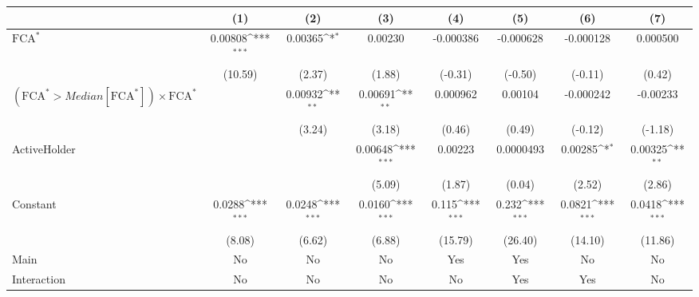 {
\def\sym#1{\ifmmode^{#1}\else\(^{#1}\)\fi}
\begin{tabular}{l*{7}{c}}
\hline\hline
                    &\multicolumn{1}{c}{(1)}         &\multicolumn{1}{c}{(2)}         &\multicolumn{1}{c}{(3)}         &\multicolumn{1}{c}{(4)}         &\multicolumn{1}{c}{(5)}         &\multicolumn{1}{c}{(6)}         &\multicolumn{1}{c}{(7)}         \\
\hline
$ \text{FCA}^* $    &     0.00808\sym{***}&     0.00365\sym{*}  &     0.00230         &   -0.000386         &   -0.000628         &   -0.000128         &    0.000500         \\
                    &     (10.59)         &      (2.37)         &      (1.88)         &     (-0.31)         &     (-0.50)         &     (-0.11)         &      (0.42)         \\
[1em]
 $ (\text{FCA}^* > Median[\text{FCA}^*]) \times {\text{FCA} ^*}  $ &                     &     0.00932\sym{**} &     0.00691\sym{**} &    0.000962         &     0.00104         &   -0.000242         &    -0.00233         \\
                    &                     &      (3.24)         &      (3.18)         &      (0.46)         &      (0.49)         &     (-0.12)         &     (-1.18)         \\
[1em]
ActiveHolder        &                     &                     &     0.00648\sym{***}&     0.00223         &   0.0000493         &     0.00285\sym{*}  &     0.00325\sym{**} \\
                    &                     &                     &      (5.09)         &      (1.87)         &      (0.04)         &      (2.52)         &      (2.86)         \\
[1em]
Constant            &      0.0288\sym{***}&      0.0248\sym{***}&      0.0160\sym{***}&       0.115\sym{***}&       0.232\sym{***}&      0.0821\sym{***}&      0.0418\sym{***}\\
                    &      (8.08)         &      (6.62)         &      (6.88)         &     (15.79)         &     (26.40)         &     (14.10)         &     (11.86)         \\
\hline
Main                &          No         &          No         &          No         &         Yes         &         Yes         &          No         &          No         \\
Interaction         &          No         &          No         &          No         &          No         &         Yes         &         Yes         &          No         \\

\end{tabular}}
